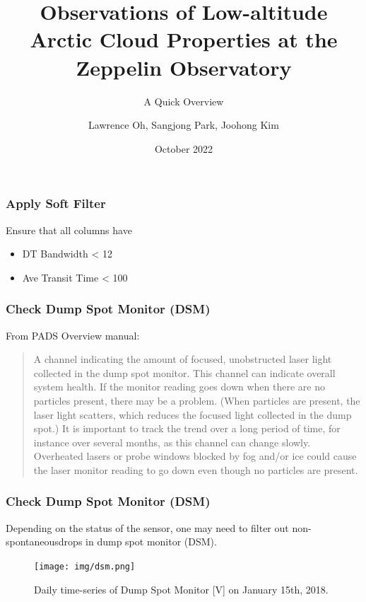 \documentclass{beamer}
\title{Observations of Low-altitude Arctic Cloud Properties at the Zeppelin Observatory}
\subtitle{A Quick Overview}
\author{Lawrence Oh, Sangjong Park, Joohong Kim}
\institute{Korea Polar Research Institute (KOPRI)}
\date{October 2022}
\begin{document}
\frame{\titlepage}

\begin{frame}
    \frametitle{Apply Soft Filter}
    Ensure that all columns have

    \begin{itemize}
        \item DT Bandwidth < 12
        \item Ave Transit Time < 100\footnotemark
    \end{itemize}

\end{frame}

\begin{frame}
    \frametitle{Check Dump Spot Monitor (DSM)}
    From PADS Overview manual:

    \begin{quote}
        \small{A channel indicating the amount of focused, unobstructed laser light collected in the dump spot monitor. This channel can indicate overall system health. If the monitor reading goes down when there are no particles present, there may be a problem. (When particles are present, the laser light scatters, which reduces the focused light collected in the dump spot.) It is important to track the trend over a long period of time, for instance over several months, as this channel can change slowly. Overheated lasers or probe windows blocked by fog and/or ice could cause the laser monitor reading to go down even though no particles are present.}
    \end{quote}
\end{frame}

\begin{frame}
    \frametitle{Check Dump Spot Monitor (DSM)}
    Depending on the status of the sensor, one may need to filter out non-spontaneous\footnotemark drops in dump spot monitor (DSM).

    \begin{figure}
        \centering
        \texttt{[image: img/dsm.png]}
        \caption{Daily time-series of Dump Spot Monitor [V] on January 15th, 2018.}
    \end{figure}

\end{frame}
\end{document}
